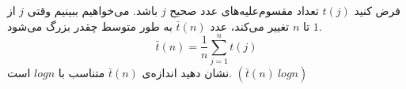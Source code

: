 \EXERCISE
فرض کنید
$t(j)$
تعداد مقسوم‌علیه‌های عدد صحیح
$j$
باشد. می‌خواهیم ببینیم وقتی
$j$
از
$1$
تا
$n$
تغییر می‌کند، عدد
$\bar{t}(n)$
به طور متوسط چقدر بزرگ می‌شود.
$$\bar{t}(n) = \frac{1}{n}\sum_{j=1}^{n}t(j)$$
نشان دهید اندازه‌ی
$\bar{t}(n)$
متناسب با
$log n$
است.
$(\bar{t}(n) ~ log n)$